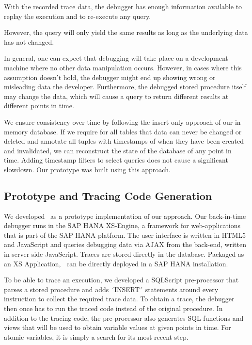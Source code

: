 With the recorded trace data, the debugger has enough information available to replay the execution and to re-execute any query.

However, the query will only yield the same results as long as the underlying data has not changed.

In general, one can expect that debugging will take place on a development machine where no other data manipulation occurs.
However, in cases where this assumption doesn't hold, the debugger might end up showing wrong or misleading data the developer.
Furthermore, the debugged stored procedure itself may change the data, which will cause a query to return different results at different points in time.

We ensure consistency over time by following the insert-only approach of our in-memory database.
If we require for all tables that data can never be changed or deleted and annotate all tuples with timestamps of when they have been created and invalidated, we can reconstruct the state of the database of any point in time.
Adding timestamp filters to select queries does not cause a significant slowdown.
Our prototype was built using this approach.


\subsection{Prototype and Tracing Code Generation}

We developed \tool\ as a prototype implementation of our approach.
Our back-in-time debugger runs in the SAP HANA XS-Engine, a framework for web-applications that is part of the SAP HANA platform.
The user interface is written in HTML5 and JavaScript and queries debugging data via AJAX from the back-end, written in server-side JavaScript.
Traces are stored directly in the database.
Packaged as an XS Application, \tool\ can be directly deployed in a SAP HANA installation.


To be able to trace an execution, we developed a SQLScript pre-processor that parses a stored procedure and adds ´INSERT´ statements around every instruction to collect the required trace data.
To obtain a trace, the debugger then once has to run the traced code instead of the original procedure.
In addition to the tracing code, the pre-processor also generates SQL functions and views that will be used to obtain variable values at given points in time.
For atomic variables, it is simply a search for its most recent step.

